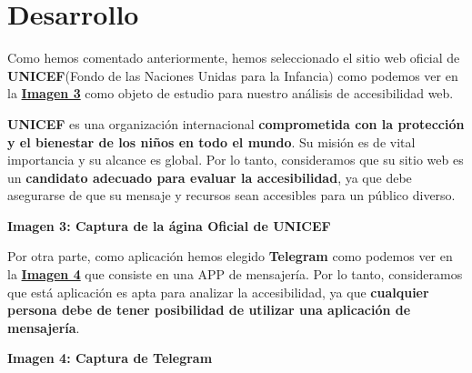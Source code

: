 \documentclass[a4paper]{article}
\newcommand{\MYhref}[3][black]{\href{#2}{\color{#1}{#3}}}
\newcommand{\paginaUnicef}{paginaUnicef.png}
\newcommand{\aplicacionTelegram}{fotoTelegramMovil.png}
\begin{document}
    \section{Desarrollo\texorpdfstring{\vspace{0.2cm}}{}} 

    \label{sec:desarrollo}
    
    Como hemos comentado anteriormente, hemos seleccionado el sitio web oficial de \textbf{UNICEF}(Fondo de las Naciones Unidas para la Infancia) como podemos ver en la \textbf{\hyperref[fig:imagen-captura-unicef]{Imagen 3}} como objeto de estudio para nuestro análisis de accesibilidad web.
    
    \vspace{0.5cm}
            
    \textbf{UNICEF} es una organización internacional \textbf{comprometida con la protección y el bienestar de los niños en todo el mundo}. Su misión es de vital importancia y su alcance es global. Por lo tanto, consideramos que su sitio web es un \textbf{candidato adecuado para evaluar la accesibilidad}, ya que debe asegurarse de que su mensaje y recursos sean accesibles para un público diverso.
            
    \begin{center}
        \vspace{0.2cm}\par\textbf{Imagen 3: Captura de la \MYhref{https://www.unicef.org} Página Oficial de UNICEF}\label{fig:imagen-captura-unicef}
    \end{center}
    
    Por otra parte, como aplicación hemos elegido \textbf{Telegram} como podemos ver en la \textbf{\hyperref[fig:imagen-captura-telegram]{Imagen 4}} que consiste en una APP de mensajería. Por lo tanto, consideramos que está aplicación es apta para analizar la accesibilidad, ya que \textbf{cualquier persona debe de tener posibilidad de utilizar una aplicación de mensajería}.
    
    \begin{center}
        \vspace{0.2cm}\par
        \textbf{Imagen 4: Captura de Telegram\label{fig:imagen-captura-telegram}}
    \end{center}
                    
\end{document}
